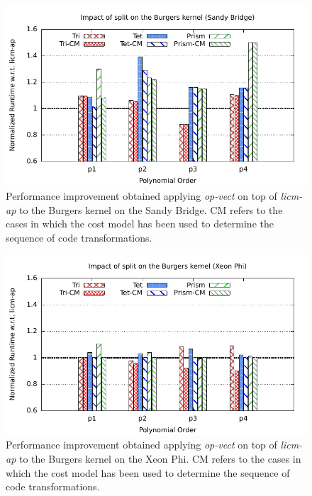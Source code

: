 \documentclass[conference]{IEEEtran}
\begin{document}
\begin{figure}[h]
\includegraphics[scale=0.7]{Pictures/burgers-normalized-split.pdf}
\caption{Performance improvement obtained applying \emph{op-vect} on top of \emph{licm-ap} to the Burgers kernel on the Sandy Bridge. CM refers to the cases in which the cost model has been used to determine the sequence of code transformations.}
\label{fig:split-burgers-speedup}
\end{figure}

\begin{figure}[h]
\includegraphics[scale=0.7]{Pictures/burgers-normalized-split-phi.pdf}
\caption{Performance improvement obtained applying \emph{op-vect} on top of \emph{licm-ap} to the Burgers kernel on the Xeon Phi. CM refers to the cases in which the cost model has been used to determine the sequence of code transformations.}
\label{fig:split-burgers-speedup-phi}
\end{figure}
\end{document}
